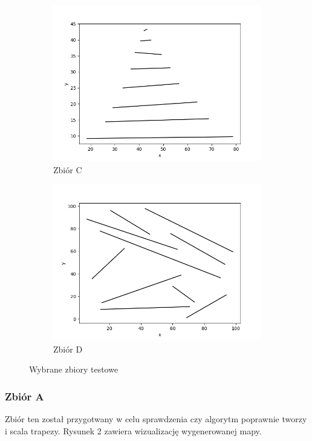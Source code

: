 \documentclass[11pt,a4paper]{article}
\begin{document}
\begin{figure}[H]
\begin{subfigure}[b]{0.46\textwidth}
        \includegraphics[scale=0.4]{res/figs/test_c.png}
        \caption{
            Zbiór C
        }
    \end{subfigure}
    \begin{subfigure}[b]{0.46\textwidth}
        \centering
        \includegraphics[scale=0.4]{res/figs/test_d.png}
        \caption{
            Zbiór D
        }
    \end{subfigure}
    \caption{Wybrane zbiory testowe}
\end{figure}

\subsubsection{Zbiór A}
Zbiór ten został przygotwany w celu sprawdzenia
czy algorytm poprawnie tworzy i scala trapezy.
Rysunek 2 zawiera wizualizację wygenerowanej mapy.
\end{document}
